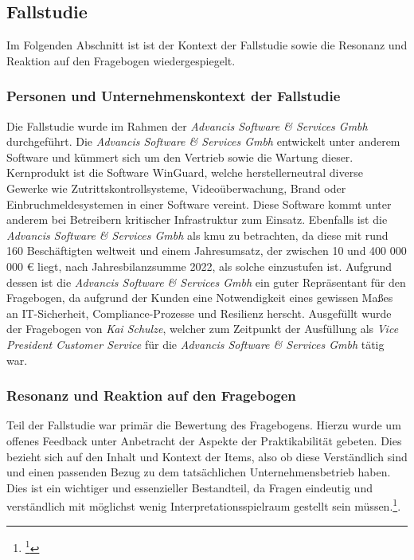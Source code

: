 \documentclass[11pt,a4paper,hidelinks]{article}   %
\begin{document}
        \subsection{Fallstudie}
        Im Folgenden Abschnitt ist ist der Kontext der Fallstudie sowie die Resonanz und Reaktion auf den Fragebogen wiedergespiegelt. 
        \subsubsection{Personen und Unternehmenskontext der Fallstudie}
        Die Fallstudie wurde im Rahmen der \emph{Advancis Software \& Services Gmbh} durchgeführt. Die \emph{Advancis Software \& Services Gmbh} entwickelt unter anderem Software und kümmert sich um den Vertrieb sowie die Wartung dieser. Kernprodukt ist die Software WinGuard, welche herstellerneutral diverse Gewerke wie Zutrittskontrollsysteme, Videoüberwachung, Brand oder Einbruchmeldesystemen in einer Software vereint. Diese Software kommt unter anderem bei Betreibern kritischer Infrastruktur zum Einsatz. Ebenfalls ist die \emph{Advancis Software \& Services Gmbh} als \gls{kmu} zu betrachten, da diese mit rund 160 Beschäftigten weltweit und einem Jahresumsatz, der zwischen 10 und 400 000 000 € liegt, nach Jahresbilanzsumme 2022, als solche einzustufen ist. Aufgrund dessen ist die \emph{Advancis Software \& Services Gmbh} ein guter Repräsentant für den Fragebogen, da aufgrund der Kunden eine Notwendigkeit eines gewissen Maßes an IT-Sicherheit, Compliance-Prozesse und Resilienz herscht. Ausgefüllt wurde der Fragebogen von \emph{Kai Schulze}, welcher zum Zeitpunkt der Ausfüllung als \emph{Vice President Customer Service} für die \emph{Advancis Software \& Services Gmbh} tätig war.
        \subsubsection{Resonanz und Reaktion auf den Fragebogen}
        Teil der Fallstudie war primär die Bewertung des Fragebogens. Hierzu wurde um offenes Feedback unter Anbetracht der Aspekte der Praktikabilität gebeten. Dies bezieht sich auf den Inhalt und Kontext der Items, also ob diese Verständlich sind und einen passenden Bezug zu dem tatsächlichen Unternehmensbetrieb haben. Dies ist ein wichtiger und essenzieller Bestandteil, da Fragen eindeutig und verständlich mit möglichst wenig Interpretationsspielraum gestellt sein müssen.\footnote{
            \footcite[Vgl.][, S. 59 - 60, 62 - 64 \& 66 - 68]{9783838544656}
        }.
\end{document}
